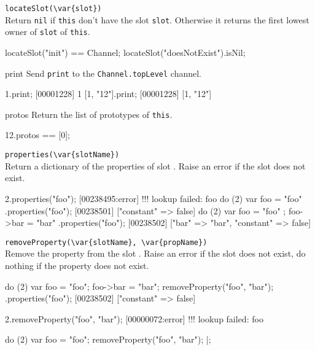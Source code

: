 \begin{urbiscriptapi}
\item \lstinline|locateSlot(\var{slot})|\\
  Return \lstinline|nil| if \lstinline|this| don't have the slot
  \lstinline|slot|. Otherwise it returns the first lowest owner of
  \lstinline|slot| of \lstinline|this|.
\begin{urbiassert}
locateSlot("init") == Channel;
locateSlot("doesNotExist").isNil;
\end{urbiassert}

\item[print]
  Send \lstinline|print| to the \lstinline|Channel.topLevel| channel.
\begin{urbiscript}
1.print;
[00001228] 1
[1, "12"].print;
[00001228] [1, "12"]
\end{urbiscript}

\item[protos]
  Return the list of prototypes of \lstinline|this|.
\begin{urbiassert}
12.protos == [0];
\end{urbiassert}

\item \lstinline|properties(\var{slotName})|\\
  Return a dictionary of the properties of slot .  Raise
  an error if the slot does not exist.
\begin{urbiscript}
2.properties("foo");
[00238495:error] !!! lookup failed: foo
do (2) { var foo = "foo" }.properties("foo");
[00238501] ["constant" => false]
do (2) { var foo = "foo" ; foo->bar = "bar" }.properties("foo");
[00238502] ["bar" => "bar", "constant" => false]
\end{urbiscript}

\item \lstinline|removeProperty(\var{slotName}, \var{propName})|\\
  Remove the property  from the slot .
  Raise an error if the slot does not exist, do nothing if the
  property does not exist.
\begin{urbiscript}
do (2)
{
  var foo = "foo";
  foo->bar = "bar";
  removeProperty("foo", "bar");
}.properties("foo");
[00238502] ["constant" => false]

2.removeProperty("foo", "bar");
[00000072:error] !!! lookup failed: foo

do (2)
{
  var foo = "foo";
  removeProperty("foo", "bar");
}|;
\end{urbiscript}


\end{urbiscriptapi}
